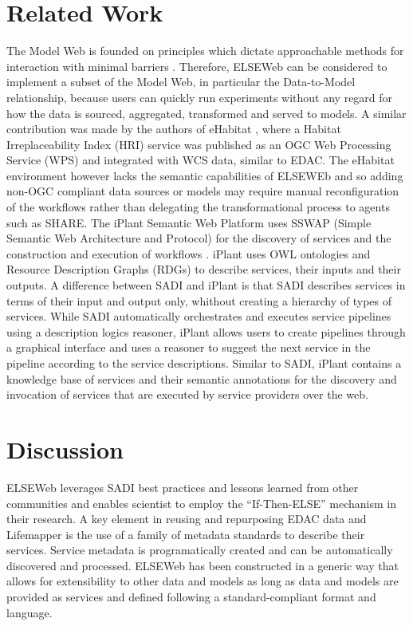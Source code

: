 \documentclass[letterpaper]{article}
\begin{document}
\section{Related Work}
The Model Web is founded on principles which dictate approachable methods for interaction with minimal barriers \cite{geller2008looking}. Therefore, ELSEWeb can be considered to implement a subset of the Model Web, in particular the Data-to-Model relationship, because users can quickly run experiments without any regard for how the data is sourced, aggregated, transformed and served to models. A similar contribution was made by the authors of eHabitat \cite{dubois2011ehabitat}, where a Habitat Irreplaceability Index (HRI) service was published as an OGC Web Processing Service (WPS) and integrated with WCS data, similar to EDAC. The eHabitat environment however lacks the semantic capabilities of ELSEWEb and so adding non-OGC compliant data sources or models may require manual reconfiguration of the workflows rather than delegating the transformational process to agents such as SHARE. The iPlant Semantic Web Platform uses SSWAP (Simple Semantic Web Architecture and Protocol) for the discovery of services and the construction and execution of workflows \cite{gessleriplant}. iPlant uses OWL ontologies and Resource Description Graphs (RDGs) to describe services, their inputs and their outputs. A difference between SADI and iPlant is that SADI describes services in terms of their input and output only, whithout creating a hierarchy of types of services. While SADI automatically orchestrates and executes service pipelines using a description logics reasoner, iPlant allows users to create pipelines through a graphical interface and uses a reasoner to suggest the next service in the pipeline according to the service descriptions. Similar to SADI, iPlant contains a knowledge base of services and their semantic annotations for the discovery and invocation of services that are executed by service providers over the web.   


\section{Discussion}
ELSEWeb leverages SADI best practices and lessons learned from other communities \cite{vandervalk2010share,vandervalk2013sadi,callahan2013ontology,riazanov2012ecotoxicology} and enables scientist to employ the ``If-Then-ELSE'' mechanism in their research. A key element in reusing and repurposing EDAC data and Lifemapper is the use of a family of metadata standards to describe their services. Service metadata is programatically created and can be automatically discovered and processed. ELSEWeb has been constructed in a generic way that allows for extensibility to other data and models as long as data and models are provided as services and defined following a standard-compliant format and language. 
\end{document}
